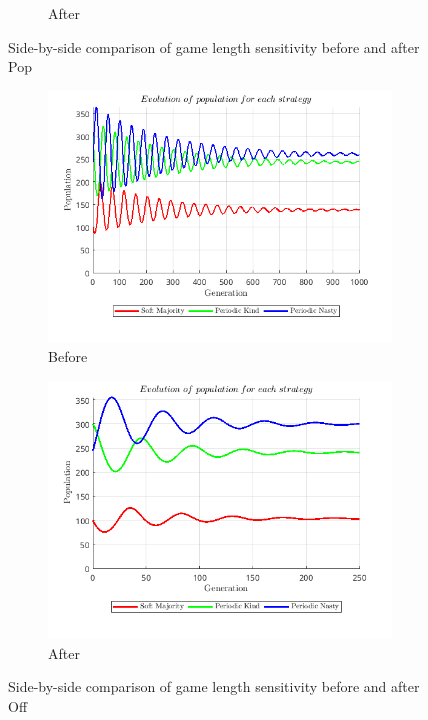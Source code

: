 \documentclass[12pt]{report}
\begin{document}
\begin{figure}[H]
\begin{subfigure}[t]{0.45\textwidth}
        \caption{After}
    \end{subfigure}
    \caption{Side-by-side comparison of game length sensitivity before and after Pop}
\end{figure}

\begin{figure}[H]
    \centering
    \begin{subfigure}[t]{0.45\textwidth}
        \centering
        \includegraphics[width=\textwidth]{game_length_sensitivity_before_off.png}
        \caption{Before}
    \end{subfigure}
    \hfill
    \begin{subfigure}[t]{0.45\textwidth}
        \centering
        \includegraphics[width=\textwidth]{game_length_sensitivity_after_off.png}
        \caption{After}
    \end{subfigure}
    \caption{Side-by-side comparison of game length sensitivity before and after Off}
\end{figure}
\end{document}
